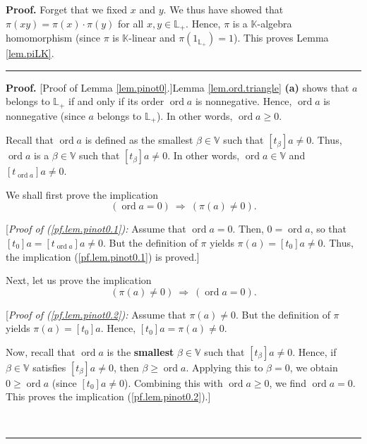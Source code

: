 \documentclass[numbers=enddot,12pt,final,onecolumn,notitlepage]{scrartcl}%
\theoremstyle{definition}
\newenvironment{proof}[1][Proof]{\noindent\textbf{#1.} }{\ \rule{0.5em}{0.5em}}
\renewcommand{\geq}{\geqslant}
\theoremstyle{plainsl}
\begin{document}
\begin{proof}
Forget that we fixed $x$ and $y$. We thus have showed that $\pi\left(
xy\right)  =\pi\left(  x\right)  \cdot\pi\left(  y\right)  $ for all
$x,y\in\mathbb{L}_{+}$. Hence, $\pi$ is a $\mathbb{K}$-algebra homomorphism
(since $\pi$ is $\mathbb{K}$-linear and $\pi\left(  1_{\mathbb{L}_{+}}\right)
=1$). This proves Lemma \ref{lem.piLK}.
\end{proof}

\begin{proof}
[Proof of Lemma \ref{lem.pinot0}.]Lemma \ref{lem.ord.triangle} \textbf{(a)}
shows that $a$ belongs to $\mathbb{L}_{+}$ if and only if its order
$\operatorname*{ord}a$ is nonnegative. Hence, $\operatorname*{ord}a$ is
nonnegative (since $a$ belongs to $\mathbb{L}_{+}$). In other words,
$\operatorname*{ord}a\geq0$.

Recall that $\operatorname*{ord}a$ is defined as the smallest $\beta
\in\mathbb{V}$ such that $\left[  t_{\beta}\right]  a\neq0$. Thus,
$\operatorname*{ord}a$ is a $\beta\in\mathbb{V}$ such that $\left[  t_{\beta
}\right]  a\neq0$. In other words, $\operatorname*{ord}a\in\mathbb{V}$ and
$\left[  t_{\operatorname*{ord}a}\right]  a\neq0$.

We shall first prove the implication%
\begin{equation}
\left(  \operatorname*{ord}a=0\right)  \ \Longrightarrow\ \left(  \pi\left(
a\right)  \neq0\right)  . \label{pf.lem.pinot0.1}%
\end{equation}


[\textit{Proof of (\ref{pf.lem.pinot0.1}):} Assume that $\operatorname*{ord}%
a=0$. Then, $0=\operatorname*{ord}a$, so that $\left[  t_{0}\right]  a=\left[
t_{\operatorname*{ord}a}\right]  a\neq0$. But the definition of $\pi$ yields
$\pi\left(  a\right)  =\left[  t_{0}\right]  a\neq0$. Thus, the implication
(\ref{pf.lem.pinot0.1}) is proved.]

Next, let us prove the implication%
\begin{equation}
\left(  \pi\left(  a\right)  \neq0\right)  \ \Longrightarrow\ \left(
\operatorname*{ord}a=0\right)  . \label{pf.lem.pinot0.2}%
\end{equation}


[\textit{Proof of (\ref{pf.lem.pinot0.2}):} Assume that $\pi\left(  a\right)
\neq0$. But the definition of $\pi$ yields $\pi\left(  a\right)  =\left[
t_{0}\right]  a$. Hence, $\left[  t_{0}\right]  a=\pi\left(  a\right)  \neq0$.

Now, recall that $\operatorname*{ord}a$ is the \textbf{smallest} $\beta
\in\mathbb{V}$ such that $\left[  t_{\beta}\right]  a\neq0$. Hence, if
$\beta\in\mathbb{V}$ satisfies $\left[  t_{\beta}\right]  a\neq0$, then
$\beta\geq\operatorname*{ord}a$. Applying this to $\beta=0$, we obtain
$0\geq\operatorname*{ord}a$ (since $\left[  t_{0}\right]  a\neq0$). Combining
this with $\operatorname*{ord}a\geq0$, we find $\operatorname*{ord}a=0$. This
proves the implication (\ref{pf.lem.pinot0.2}).]


\end{proof}
\end{document}
